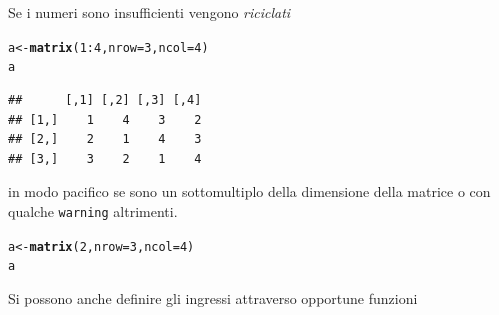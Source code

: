 \documentclass[onecolumn,12pt]{book}\usepackage[]{graphicx}\usepackage[]{color}
\makeatletter
\newcommand{\hlnum}[1]{\textcolor[rgb]{0.686,0.059,0.569}{#1}}%
\newcommand{\hlopt}[1]{\textcolor[rgb]{0,0,0}{#1}}%
\newcommand{\hlstd}[1]{\textcolor[rgb]{0.345,0.345,0.345}{#1}}%
\newcommand{\hlkwb}[1]{\textcolor[rgb]{0.69,0.353,0.396}{#1}}%
\newcommand{\hlkwc}[1]{\textcolor[rgb]{0.333,0.667,0.333}{#1}}%
\newcommand{\hlkwd}[1]{\textcolor[rgb]{0.737,0.353,0.396}{\textbf{#1}}}%
\newenvironment{kframe}{%
 \def\at@end@of@kframe{}%
 \ifinner\ifhmode%
  \def\at@end@of@kframe{\end{minipage}}%
  \begin{minipage}{\columnwidth}%
 \fi\fi%
 \def\FrameCommand##1{\hskip\@totalleftmargin \hskip-\fboxsep
 \colorbox{shadecolor}{##1}\hskip-\fboxsep
     \hskip-\linewidth \hskip-\@totalleftmargin \hskip\columnwidth}%
 \MakeFramed {\advance\hsize-\width
   \@totalleftmargin\z@ \linewidth\hsize
   \@setminipage}}%
 {\par\unskip\endMakeFramed%
 \at@end@of@kframe}
\newenvironment{knitrout}{}{} %
\makeatother
\begin{document}
Se i numeri sono insufficienti vengono \emph {riciclati}
\begin{knitrout}
\color{fgcolor}\begin{kframe}
\begin{alltt}
\hlstd{a}\hlkwb{<-}\hlkwd{matrix}\hlstd{(}\hlnum{1}\hlopt{:}\hlnum{4}\hlstd{,}\hlkwc{nrow}\hlstd{=}\hlnum{3}\hlstd{,}\hlkwc{ncol}\hlstd{=}\hlnum{4}\hlstd{)}
\hlstd{a}
\end{alltt}
\begin{verbatim}
##      [,1] [,2] [,3] [,4]
## [1,]    1    4    3    2
## [2,]    2    1    4    3
## [3,]    3    2    1    4
\end{verbatim}
\end{kframe}
\end{knitrout}
in modo pacifico se sono un sottomultiplo della dimensione della matrice o con qualche
\texttt{warning} altrimenti.
\begin{knitrout}
\color{fgcolor}\begin{kframe}
\begin{alltt}
\hlstd{a}\hlkwb{<-}\hlkwd{matrix}\hlstd{(}\hlnum{2}\hlstd{,}\hlkwc{nrow}\hlstd{=}\hlnum{3}\hlstd{,}\hlkwc{ncol}\hlstd{=}\hlnum{4}\hlstd{)}
\hlstd{a}
\end{alltt}
\end{kframe}
\end{knitrout}
Si possono anche definire gli ingressi attraverso opportune funzioni
\end{document}
